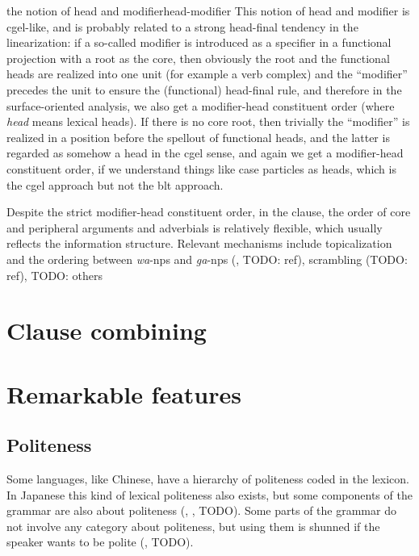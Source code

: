 \documentclass[UTF8, a4paper, oneside, scheme=plain]{ctexrep}
\newcommand*{\term}[1]{\emph{#1}}
\newcommand{\corpus}[1]{\emph{#1}}
\begin{document}
\begin{theorybox}{the notion of head and modifier}{head-modifier}
    This notion of head and modifier is \acs{cgel}-like, 
    and is probably related to a strong head-final tendency in the linearization:
    if a so-called modifier is introduced as a specifier 
    in a functional projection with a root as the core,
    then obviously the root and the functional heads are realized into one unit (for example a verb complex) 
    and the ``modifier'' precedes the unit to ensure the (functional) head-final rule,
    and therefore in the surface-oriented analysis,
    we also get a modifier-head constituent order (where \term{head} means lexical heads).
    If there is no core root,
    then trivially the ``modifier'' is realized in a position before the spellout of functional heads,
    and the latter is regarded as somehow a head in the \acs{cgel} sense,
    and again we get a modifier-head constituent order,
    if we understand things like case particles as heads,
    which is the \ac{cgel} approach but not the \acs{blt} approach.
\end{theorybox}

Despite the strict modifier-head constituent order,
in the clause, the order of core and peripheral arguments and adverbials is relatively flexible,
which usually reflects the information structure.
Relevant mechanisms include 
topicalization and the ordering between \corpus{wa}-\ac{np}s and \corpus{ga}-\ac{np}s 
(, TODO: ref), scrambling (TODO: ref), 
TODO: others

\section{Clause combining}

\section{Remarkable features}

\subsection{Politeness}

Some languages, like Chinese, have a hierarchy of politeness coded in the lexicon.
In Japanese this kind of lexical politeness also exists,
but some components of the grammar are also about politeness
(, , TODO).
Some parts of the grammar do not involve any category about politeness,
but using them is shunned if the speaker wants to be polite
(, TODO).
\end{document}
